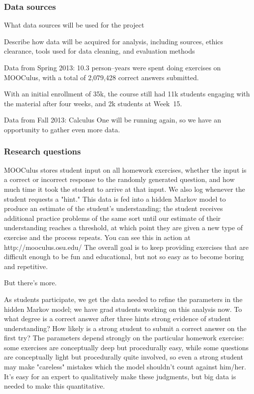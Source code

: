 \documentclass[12pt]{article}
\begin{document}
\subsubsection*{Data sources}

What data sources will be used for the project

Describe how data will be acquired for analysis, including sources,
ethics clearance, tools used for data cleaning, and evaluation
methods

Data from Spring 2013: 10.3 person--years were spent doing exercises
on MOOCulus, with a total of 2,079,428 correct answers submitted.

With an initial enrollment of 35k, the course still had 11k students
engaging with the material after four weeks, and 2k students at
Week~15.

Data from Fall 2013: Calculus One will be running again, so we have an
opportunity to gather even more data.

\subsubsection*{Research questions}

MOOCulus stores student input on all homework exercises, whether the
input is a correct or incorrect response to the randomly generated
question, and how much time it took the student to arrive at that
input.  We also log whenever the student requests a "hint."  This data
is fed into a hidden Markov model to produce an estimate of the
student's understanding; the student receives additional practice
problems of the same sort until our estimate of their understanding
reaches a threshold, at which point they are given a new type of
exercise and the process repeats.  You can see this in action at
http://mooculus.osu.edu/ The overall goal is to keep providing
exercises that are difficult enough to be fun and educational, but not
so easy as to become boring and repetitive.

But there's more.

As students participate, we get the data needed to refine the
parameters in the hidden Markov model; we have grad students working
on this analysis now.  To what degree is a correct answer after three
hints strong evidence of student understanding?  How likely is a
strong student to submit a correct answer on the first try?  The
parameters depend strongly on the particular homework exercise: some
exercises are conceptually deep but procedurally easy, while some
questions are conceptually light but procedurally quite involved, so
even a strong student may make "careless" mistakes which the model
shouldn't count against him/her.  It's easy for an expert to
qualitatively make these judgments, but big data is needed to make
this quantitative.
\end{document}
